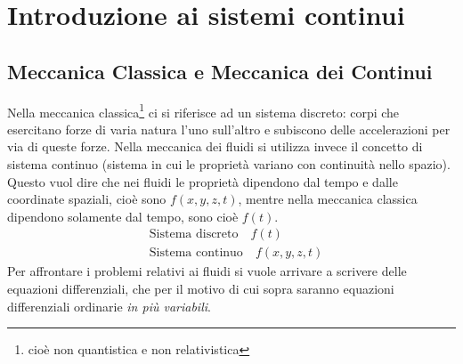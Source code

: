 %
\section{Introduzione ai sistemi continui}
%
\subsection{Meccanica Classica e Meccanica dei Continui}
Nella meccanica classica\footnote{cioè non quantistica e non relativistica} ci si riferisce ad un sistema discreto: corpi che esercitano forze di varia natura l'uno sull'altro e subiscono delle accelerazioni per via di queste forze.
Nella meccanica dei fluidi si utilizza invece il concetto di sistema continuo (sistema in cui le proprietà variano con continuità nello spazio).
Questo vuol dire che nei fluidi le proprietà dipendono dal tempo e dalle coordinate spaziali, cioè sono $f(x, y, z, t)$, mentre nella meccanica classica dipendono solamente dal tempo, sono cioè $f(t)$.
%
	\begin{equation*}
		\begin{aligned}
			&\text{Sistema discreto} \quad  f(t)  \\ %
			&\text{Sistema continuo} \quad f(x, y, z, t)
		\end{aligned}
	\end{equation*}
%
Per affrontare i problemi relativi ai fluidi si vuole arrivare a scrivere delle equazioni differenziali, che  per il motivo di cui sopra saranno equazioni differenziali ordinarie \textit{in più variabili}.
%
